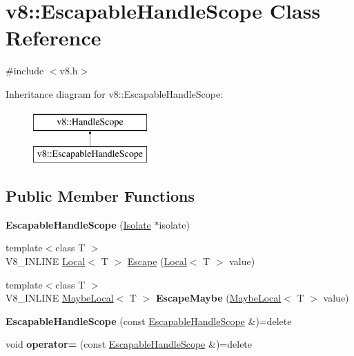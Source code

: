 \hypertarget{classv8_1_1EscapableHandleScope}{}\section{v8\+:\+:Escapable\+Handle\+Scope Class Reference}
\label{classv8_1_1EscapableHandleScope}


{\ttfamily \#include $<$v8.\+h$>$}

Inheritance diagram for v8\+:\+:Escapable\+Handle\+Scope\+:\begin{figure}[H]
\begin{center}
\leavevmode
\includegraphics[height=2.000000cm]{classv8_1_1EscapableHandleScope}
\end{center}
\end{figure}
\subsection*{Public Member Functions}
\begin{DoxyCompactItemize}
\item 
\mbox{\label{classv8_1_1EscapableHandleScope_aea39a7fd4dee6da31f3921ff891e1731}} 
{\bfseries Escapable\+Handle\+Scope} (\mbox{\hyperlink{classv8_1_1Isolate}{Isolate}} $\ast$isolate)
\item 
{\footnotesize template$<$class T $>$ }\\V8\+\_\+\+I\+N\+L\+I\+NE \mbox{\hyperlink{classv8_1_1Local}{Local}}$<$ T $>$ \mbox{\hyperlink{classv8_1_1EscapableHandleScope_afdf0d3850978f65d1a827f78b3a2b6fd}{Escape}} (\mbox{\hyperlink{classv8_1_1Local}{Local}}$<$ T $>$ value)
\item 
\mbox{\label{classv8_1_1EscapableHandleScope_a7e0ca63c86c3f0cbc87784f601cf4ad5}} 
{\footnotesize template$<$class T $>$ }\\V8\+\_\+\+I\+N\+L\+I\+NE \mbox{\hyperlink{classv8_1_1MaybeLocal}{Maybe\+Local}}$<$ T $>$ {\bfseries Escape\+Maybe} (\mbox{\hyperlink{classv8_1_1MaybeLocal}{Maybe\+Local}}$<$ T $>$ value)
\item 
\mbox{\label{classv8_1_1EscapableHandleScope_a1a50d87127787da65c679a361fc8967d}} 
{\bfseries Escapable\+Handle\+Scope} (const \mbox{\hyperlink{classv8_1_1EscapableHandleScope}{Escapable\+Handle\+Scope}} \&)=delete
\item 
\mbox{\label{classv8_1_1EscapableHandleScope_a95b116173bfb5a478068caa0ff275999}} 
void {\bfseries operator=} (const \mbox{\hyperlink{classv8_1_1EscapableHandleScope}{Escapable\+Handle\+Scope}} \&)=delete
\end{DoxyCompactItemize}
